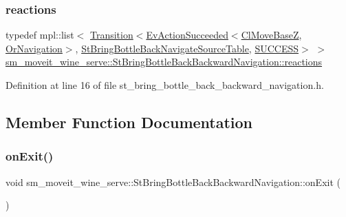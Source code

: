 \subsubsection{\texorpdfstring{reactions}{reactions}}
{\footnotesize\ttfamily typedef mpl\+::list$<$ \hyperlink{classsmacc_1_1Transition}{Transition}$<$\hyperlink{structsmacc_1_1default__events_1_1EvActionSucceeded}{Ev\+Action\+Succeeded}$<$\hyperlink{classcl__move__base__z_1_1ClMoveBaseZ}{Cl\+Move\+BaseZ}, \hyperlink{classsm__moveit__wine__serve_1_1OrNavigation}{Or\+Navigation}$>$, \hyperlink{structsm__moveit__wine__serve_1_1StBringBottleBackNavigateSourceTable}{St\+Bring\+Bottle\+Back\+Navigate\+Source\+Table}, \hyperlink{structsmacc_1_1default__transition__tags_1_1SUCCESS}{S\+U\+C\+C\+E\+SS}$>$ $>$ \hyperlink{structsm__moveit__wine__serve_1_1StBringBottleBackBackwardNavigation_ac421e44272cd54e0103e8eeba084028d}{sm\+\_\+moveit\+\_\+wine\+\_\+serve\+::\+St\+Bring\+Bottle\+Back\+Backward\+Navigation\+::reactions}}



Definition at line 16 of file st\+\_\+bring\+\_\+bottle\+\_\+back\+\_\+backward\+\_\+navigation.\+h.



\subsection{Member Function Documentation}
\mbox{\label{structsm__moveit__wine__serve_1_1StBringBottleBackBackwardNavigation_a8794d412445f0d4f7943ef7e3a496776}} 
\subsubsection{\texorpdfstring{on\+Exit()}{onExit()}}
{\footnotesize\ttfamily void sm\+\_\+moveit\+\_\+wine\+\_\+serve\+::\+St\+Bring\+Bottle\+Back\+Backward\+Navigation\+::on\+Exit (\begin{DoxyParamCaption}{ }\end{DoxyParamCaption})\hspace{0.3cm}{\ttfamily [inline]}}



